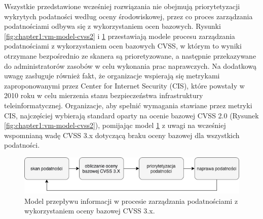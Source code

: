 \bigbreak
Wszystkie przedstawione wcześniej rozwiązania nie obejmują priorytetyzacji wykrytych podatności według oceny środowiskowej, przez co proces zarządzania podatnościami odbywa się z wykorzystaniem ocen bazowych. Rysunki \ref{fig:chapter1:vm-model-cvss2} i \ref{fig:chapter1:vm-model-cvss3} przestawiają modele procesu zarządzania podatnościami z wykorzystaniem ocen bazowych CVSS, w którym to wyniki otrzymane bezpośrednio ze skanera są prioretyzowane, a następnie przekazywane do administratorów zasobów w celu wykonania prac naprawczych. Na dodatkową uwagę zasługuje również fakt, że organizacje wspierają się metrykami zaproponowanymi przez Center for Internet Security (CIS), które powstały w 2010 roku \cite{CIS-2010, Walk2109-Automatic} w celu mierzenia stanu bezpieczeństwa infrastruktury teleinformatycznej. Organizacje, aby spełnić wymagania stawiane przez metryki CIS, najczęściej wybierają standard oparty na ocenie bazowej CVSS 2.0 (Rysunek \ref{fig:chapter1:vm-model-cvss2}), pomijając model \ref{fig:chapter1:vm-model-cvss3} z uwagi na wcześniej wspomnianą wadę CVSS 3.x dotyczącą braku oceny bazowej dla wszystkich podatności.


\begin{figure}[!ht]
\centering
\includegraphics[width=.9\textwidth]{Chapters/Wstep/vm-models/vm-model-cvss3.png}
\caption{Model przepływu informacji w procesie zarządzania podatnościami z wykorzystaniem oceny bazowej CVSS 3.x.}
\label{fig:chapter1:vm-model-cvss3}
\end{figure}

